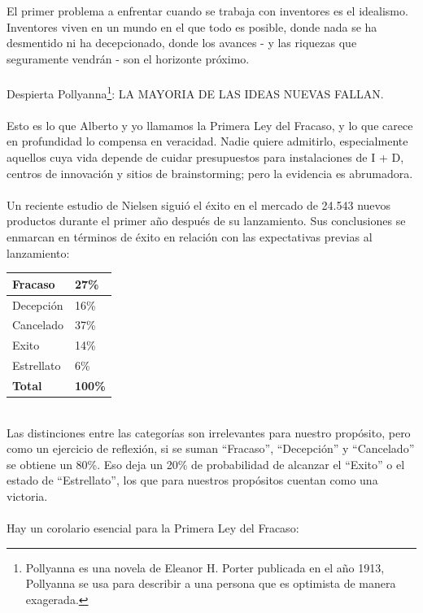 \documentclass{article}
\begin{document}
El primer problema a enfrentar cuando se trabaja con inventores es el idealismo. Inventores viven en un mundo en el que todo es posible, donde nada se ha desmentido ni ha decepcionado, donde los avances - y las riquezas que seguramente vendr\'an - son el horizonte pr\'oximo.
\\ \\
Despierta Pollyanna\footnote{Pollyanna es una novela de Eleanor H. Porter publicada en el a\~no 1913, Pollyanna se usa para describir a una persona que es optimista de manera exagerada.}: LA MAYORIA DE LAS IDEAS NUEVAS FALLAN.
\\ \\
Esto es lo que Alberto y yo llamamos la Primera Ley del Fracaso, y lo que carece en profundidad lo compensa en veracidad. Nadie quiere admitirlo, especialmente aquellos cuya vida depende de cuidar presupuestos para instalaciones de I + D, centros de innovaci\'on y sitios de brainstorming; pero la evidencia es abrumadora.
\\ \\
Un reciente estudio de Nielsen sigui\'o el \'exito en el mercado de 24.543 nuevos productos durante el primer a\~no despu\'es de su lanzamiento. Sus conclusiones se enmarcan en t\'erminos de \'exito en relaci\'on con las expectativas previas al lanzamiento:
\begin{table}[h]
\centering
    \begin{tabular}{|l|l|}
    \hline
    Fracaso       & 27\% \\ \hline
    Decepci\'on & 16\% \\ \hline
    Cancelado    & 37\% \\ \hline
    Exito      & 14\% \\ \hline
    Estrellato         & 6\%  \\ \hline
    \textbf{Total}        & \textbf{100\%} \\ \hline
    \end{tabular}
\end{table}
\\
Las distinciones entre las categor\'ias son irrelevantes para nuestro prop\'osito, pero como un ejercicio de reflexi\'on,  si se suman ``Fracaso'', ``Decepci\'on'' y ``Cancelado'' se obtiene un 80\%. Eso deja un 20\% de probabilidad de alcanzar el ``Exito'' o el estado de ``Estrellato'', los que para nuestros prop\'ositos cuentan como una victoria.
\\ \\
Hay un corolario esencial para la Primera Ley del Fracaso:
\end{document}
